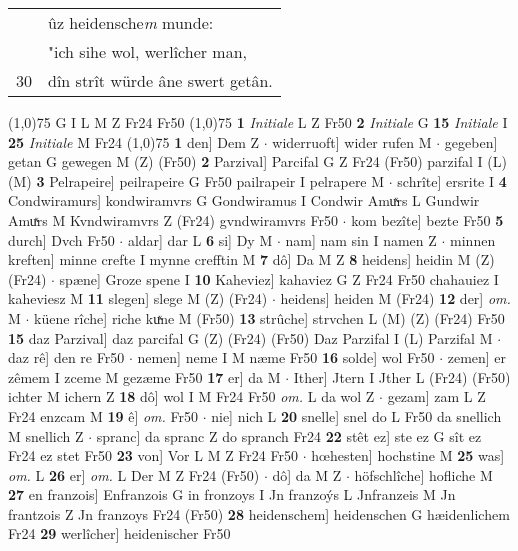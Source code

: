 \documentclass[8pt,a4paper,notitlepage]{article}
\begin{document}
\begin{table}[ht]
\begin{minipage}[t]{0.5\linewidth}
\begin{tabular}{rl}
 & ûz heidensche\textit{m} munde:\\ 
 & "ich sihe wol, werlîcher man,\\ 
30 & dîn strît würde âne swert getân.\\ 
\end{tabular}
\scriptsize
\line(1,0){75} \newline
G I L M Z Fr24 Fr50 \newline
\line(1,0){75} \newline
\textbf{1} \textit{Initiale} L Z Fr50  \textbf{2} \textit{Initiale} G  \textbf{15} \textit{Initiale} I  \textbf{25} \textit{Initiale} M Fr24  \newline
\line(1,0){75} \newline
\textbf{1} den] Dem Z  $\cdot$ widerruoft] wider rufen M  $\cdot$ gegeben] getan G gewegen M (Z) (Fr50) \textbf{2} Parzival] Parcifal G Z Fr24 (Fr50) parzifal I (L) (M) \textbf{3} Pelrapeire] peilrapeire G Fr50 pailrapeir I pelrapere M  $\cdot$ schrîte] ersrite I \textbf{4} Condwiramurs] kondwiramvrs G Gondwiramus I Condwir Amuͯrs L Gundwir Amuͯrs M Kvndwiramvrs Z (Fr24) gvndwiramvrs Fr50  $\cdot$ kom bezîte] bezte Fr50 \textbf{5} durch] Dvch Fr50  $\cdot$ aldar] dar L \textbf{6} si] Dy M  $\cdot$ nam] nam sin I namen Z  $\cdot$ minnen kreften] minne crefte I mynne crefftin M \textbf{7} dô] Da M Z \textbf{8} heidens] heidin M (Z) (Fr24)  $\cdot$ spæne] Groze spene I \textbf{10} Kaheviez] kahaviez G Z Fr24 Fr50 chahauiez I kaheviesz M \textbf{11} slegen] slege M (Z) (Fr24)  $\cdot$ heidens] heiden M (Fr24) \textbf{12} der] \textit{om.} M  $\cdot$ küene rîche] riche kuͯne M (Fr50) \textbf{13} strûche] strvchen L (M) (Z) (Fr24) Fr50 \textbf{15} daz Parzival] daz parcifal G (Z) (Fr24) (Fr50) Daz Parzifal I (L) Parzifal M  $\cdot$ daz rê] den re Fr50  $\cdot$ nemen] neme I M næme Fr50 \textbf{16} solde] wol Fr50  $\cdot$ zemen] er zêmem I zceme M gezæme Fr50 \textbf{17} er] da M  $\cdot$ Ither] Jtern I Jther L (Fr24) (Fr50) ichter M ichern Z \textbf{18} dô] wol I M Fr24 Fr50 \textit{om.} L da wol Z  $\cdot$ gezam] zam L Z Fr24 enzcam M \textbf{19} ê] \textit{om.} Fr50  $\cdot$ nie] nich L \textbf{20} snelle] snel do L Fr50 da snellich M snellich Z  $\cdot$ spranc] da spranc Z do spranch Fr24 \textbf{22} stêt ez] ste ez G sît ez Fr24 ez stet Fr50 \textbf{23} von] Vor L M Z Fr24 Fr50  $\cdot$ hœhesten] hochstine M \textbf{25} was] \textit{om.} L \textbf{26} er] \textit{om.} L Der M Z Fr24 (Fr50)  $\cdot$ dô] da M Z  $\cdot$ höfschlîche] hofliche M \textbf{27} en franzois] Enfranzois G in fronzoys I Jn franzoýs L Jnfranzeis M Jn frantzois Z Jn franzoys Fr24 (Fr50) \textbf{28} heidenschem] heidenschen G hæidenlichem Fr24 \textbf{29} werlîcher] heidenischer Fr50 \newline

\end{minipage}
\end{table}
\end{document}

